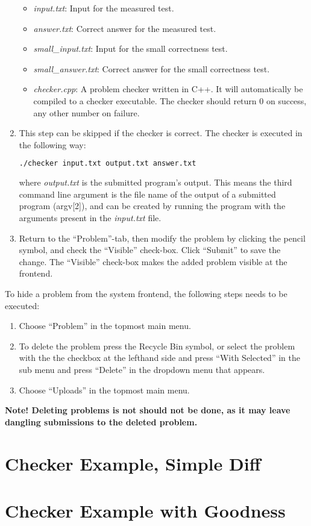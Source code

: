 \begin{enumerate}
  \begin{itemize}
    \item \textit{input.txt}: Input for the measured test.
    \item \textit{answer.txt}: Correct answer for the measured test.
    \item \textit{small\_input.txt}: Input for the small correctness test.
    \item \textit{small\_answer.txt}: Correct answer for the small correctness test.
    \item \textit{checker.cpp}: A problem checker written in C++. It will automatically be compiled to a checker executable. The checker should return 0 on success, any other number on failure.
  \end{itemize}
  \item This step can be skipped if the checker is correct. The checker is executed in the following way:
  \begin{lstlisting}[language=sh]
  ./checker input.txt output.txt answer.txt
  \end{lstlisting}
  where \textit{output.txt} is the submitted program’s output. This means the third command line argument is the file name of the output of a submitted program (argv[2]), and can be created by running the program with the arguments present in the \textit{input.txt} file.
  \item Return to the ``Problem''-tab, then modify the problem by clicking the pencil symbol, and
  check the ``Visible'' check-box. Click ``Submit'' to save the change. The ``Visible'' check-box makes the added problem visible at the frontend.
\end{enumerate}

To hide a problem from the system frontend, the following steps needs to be executed:
\begin{enumerate}
  \item Choose ``Problem'' in the topmost main menu.
  \item To delete the problem press the Recycle Bin symbol, or select the problem with the the checkbox at the lefthand side and press ``With Selected'' in the sub menu and press ``Delete'' in the dropdown menu that appears.
  \item Choose ``Uploads'' in the topmost main menu.
\end{enumerate}
\textbf{Note! Deleting problems is not should not be done, as it may leave dangling submissions to the deleted problem.}

\section{Checker Example, Simple Diff}

\section{Checker Example with Goodness}
\label{sec:checker-advanced}
